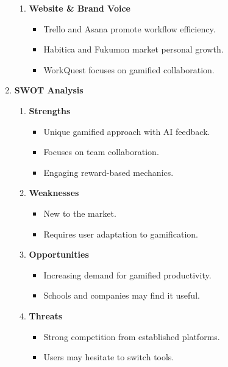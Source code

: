 \begin{enumerate}
\begin{enumerate}
        \item \textbf{Website \& Brand Voice}
        \begin{itemize}
            \item Trello and Asana promote workflow efficiency.
            \item Habitica and Fukumon market personal growth.
            \item WorkQuest focuses on gamified collaboration.
        \end{itemize}
    \end{enumerate}

    \item \textbf{SWOT Analysis}
    \begin{enumerate}
        \item \textbf{Strengths}
        \begin{itemize}
            \item Unique gamified approach with AI feedback.
            \item Focuses on team collaboration.
            \item Engaging reward-based mechanics.
        \end{itemize}
        
        \item \textbf{Weaknesses}
        \begin{itemize}
            \item New to the market.
            \item Requires user adaptation to gamification.
        \end{itemize}

        \item \textbf{Opportunities}
        \begin{itemize}
            \item Increasing demand for gamified productivity.
            \item Schools and companies may find it useful.
        \end{itemize}

        \item \textbf{Threats}
        \begin{itemize}
            \item Strong competition from established platforms.
            \item Users may hesitate to switch tools.
        \end{itemize}
    \end{enumerate}

\end{enumerate}

